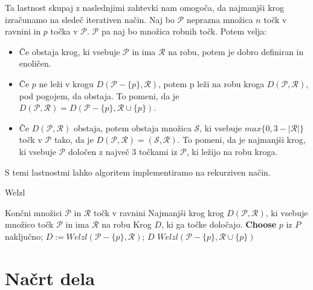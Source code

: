 \documentclass[a4paper]{article}
\begin{document}
Ta lastnost skupaj z naslednjimi zahtevki nam omogoča, da najmanjši krog izračunamo na sledeč iterativen način.
Naj bo $\mathcal{P}$ neprazna množica $n$ točk v ravnini in $p$ točka v $\mathcal{P}$. $\mathcal{P}$ pa naj bo množica  robnih točk. 
Potem velja:

\begin{itemize}
\item Če obstaja krog, ki vsebuje $\mathcal{P}$ in ima $\mathcal{R}$ na robu, potem je dobro definiran in enoličen.
\item Če $p$ ne leži v krogu $D(\mathcal{P} - \{p\},\mathcal{R})$, potem p leži na robu kroga $D(\mathcal{P},\mathcal{R})$, pod pogojem, da obstaja. To pomeni, da je $D(\mathcal{P},\mathcal{R}) = D(\mathcal{P} - \{p\}, \mathcal{R} \cup \{p\})$.
\item Če $D(\mathcal{P},\mathcal{R})$ obstaja, potem obstaja množica $\mathcal{S}$, ki vsebuje $max\{0, 3 - |\mathcal{R}|\}$ točk v $\mathcal{P}$ tako, da je $D(\mathcal{P},\mathcal{R}) = (\mathcal{S},\mathcal{R})$. To pomeni, da je najmanjši krog, ki vsebuje $\mathcal{P}$ določen z največ 3 točkami iz $\mathcal{P}$, ki ležijo na robu kroga.
\end{itemize}

S temi lastnostmi lahko algoritem implementiramo na rekurziven način.\\

\begin{algorithm}[h]
\caption {Welzl}
\begin{algorithmic} 
\REQUIRE Končni množici $\mathcal{P}$ in $\mathcal{R}$ točk v ravnini
\ENSURE Najmanjši krog krog $D(\mathcal{P},\mathcal{R})$, ki vsebuje množico točk $\mathcal{P}$ in ima $\mathcal{R}$ na robu
\RETURN Krog $D$, ki ga točke določajo.
\ELSE
\STATE \textbf{Choose} $p$ iz $P$ naključno;
\STATE $D := Welzl(\mathcal{P}-\{p\},\mathcal{R})$;
\RETURN $D$
\ENDIF
\ENDIF
\RETURN $Welzl(\mathcal{P} - \{p\}, \mathcal{R} \cup \{p\})$
\end{algorithmic}
\end{algorithm}




\section{Načrt dela}
\end{document}
